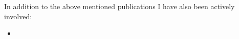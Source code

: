 In addition to the above mentioned publications I have also been actively involved:
\begin{itemize}
\item {}
\end{itemize}

                                                                                                                                    
\vspace{4.0cm}                                                                                                                                  
                                                                                                                                                
                                                                                                                                                

